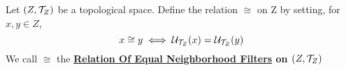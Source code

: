 \label{def:RelationOfEqualNeighborhoodFilters}
\newcommand{\RelationOfEqualNeighborhoodFilters}[1]{
    \bf \hyperref[def:RelationOfEqualNeighborhoodFilters]{Relation Of Equal Neighborhood Filters} \rm on #1
}
\begin{df}
    
    Let $(Z, \mathcal{T}_Z)$ be a topological space. Define the relation $\cong$ on Z by setting, for $x,y \in Z$, 
    \begin{equation}
        x \cong y \iff \mathcal{U}_{\mathcal{T}_Z}(x)=\mathcal{U}_{\mathcal{T}_Z}(y)
    \end{equation}
    We call $\cong$ the \RelationOfEqualNeighborhoodFilters{$(Z,\mathcal{T}_Z)$}
\end{df} 